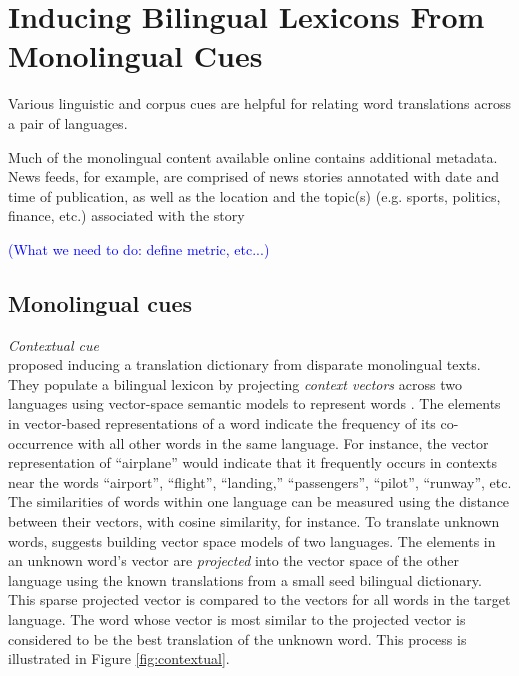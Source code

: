 \documentclass{article}
\newcommand{\todo}[1]{\textcolor{blue}{(#1)}}
\begin{document}
\section{Inducing Bilingual Lexicons From Monolingual Cues}\label{sect:cues}



Various linguistic and corpus cues are helpful for relating word translations across a pair of languages. 

Much of the monolingual content available online contains additional metadata.   News feeds, for example, are comprised of news stories annotated with date and time of publication, as well as the location and the topic(s) (e.g. sports, politics, finance, etc.) associated with the story

\todo{What we need to do: define metric, etc...}

\subsection{Monolingual cues}

\noindent\emph{Contextual cue} \\

\cite{Rapp:1999} proposed inducing a translation dictionary from disparate monolingual texts.  They populate a bilingual lexicon by projecting {\it context vectors} across two languages using vector-space semantic models to represent words  \cite{Deerwester:1990}.  The elements in vector-based representations of a word indicate the frequency of its co-occurrence with all other words in the same language.  For instance, the vector representation of ``airplane'' would indicate that it frequently occurs in contexts near the words ``airport'', ``flight'', ``landing,'' ``passengers'', ``pilot'', ``runway'',  etc.  The similarities of words within one language can be measured using the distance between their vectors, with cosine similarity, for instance.  To translate unknown words, \cite{Rapp:1999} suggests building vector space models of two languages.  The elements in an unknown word's vector are {\it projected} into the vector space of the other language using the known translations from a small seed bilingual dictionary.  This sparse projected vector is compared to the vectors for all words in the target language.  The word whose vector is most similar to the projected vector is considered to be the best translation of the unknown word.  This process is illustrated in Figure \ref{fig:contextual}.\\
\end{document}
